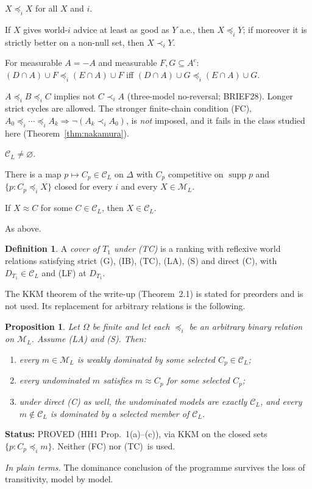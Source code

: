 \documentclass[11pt]{article}
\newtheorem{proposition}[theorem]{Proposition}
\theoremstyle{definition}
\newtheorem{definition}[theorem]{Definition}
\theoremstyle{remark}
\newcommand{\M}{\mathcal M}
\newcommand{\C}{\mathcal C}
\newcommand{\supp}{\operatorname{supp}}
\newcommand{\src}[1]{\textsf{#1}}
\newcommand{\status}[1]{\par\smallskip\noindent\textbf{Status:} #1\par}
\newcommand{\inwords}[1]{\noindent\textit{In plain terms.} #1\par\smallskip}
\newcommand{\TC}{\textup{(TC)}}
\begin{document}
\begin{description}[leftmargin=1.5em,style=unboxed,font=\normalfont\bfseries]
\item[Reflexivity.] $X\preceq_iX$ for all $X$ and $i$.
\item[Strict (G).] If $X$ gives world-$i$ advice at least as good as $Y$ a.e., then $X\preceq_iY$; if moreover it is strictly better on a non-null set, then $X\prec_iY$.
\item[(IB).] For measurable $A=-A$ and measurable $F,G\subseteq A^c$: $(D\cap A)\cup F\preceq_i(E\cap A)\cup F$ iff $(D\cap A)\cup G\preceq_i(E\cap A)\cup G$.
\item[(TC).] $A\preceq_iB\preceq_iC$ implies not $C\prec_iA$ (three-model no-reversal; \src{BRIEF28}). Longer strict cycles are allowed. The stronger finite-chain condition (FC), $A_0\preceq_i\cdots\preceq_iA_k\Rightarrow\neg(A_k\prec_iA_0)$, is \emph{not} imposed, and it fails in the class studied here (Theorem~\ref{thm:nakamura}).
\item[(LA).] $\C_L\ne\varnothing$.
\item[(S).] There is a map $p\mapsto C_p\in\C_L$ on $\Delta$ with $C_p$ competitive on $\supp p$ and $\{p:C_p\preceq_iX\}$ closed for every $i$ and every $X\in\M_L$.
\item[Direct (C).] If $X\approx C$ for some $C\in\C_L$, then $X\in\C_L$.
\item[(LF) at the target.] As above.
\end{description}

\begin{definition}\label{def:cover}
A \emph{cover of $T_1$ under \TC} is a ranking with reflexive world relations satisfying strict (G), (IB), \TC, (LA), (S) and direct (C), with $D_{T_1}\in\C_L$ and (LF) at $D_{T_1}$.
\end{definition}

The KKM theorem of the write-up (Theorem~2.1) is stated for preorders and is not used. Its replacement for arbitrary relations is the following.

\begin{proposition}\label{prop:hh1}
Let $\Omega$ be finite and let each $\preceq_i$ be an arbitrary binary relation on $\M_L$. Assume (LA) and (S). Then:
\begin{enumerate}[label=(\alph*)]
\item every $m\in\M_L$ is weakly dominated by some selected $C_p\in\C_L$;
\item every undominated $m$ satisfies $m\approx C_p$ for some selected $C_p$;
\item under direct (C) as well, the undominated models are exactly $\C_L$, and every $m\notin\C_L$ is dominated by a selected member of $\C_L$.
\end{enumerate}
\end{proposition}
\status{PROVED (\src{HH1} Prop.~1(a)--(c)), via KKM on the closed sets $\{p:C_p\preceq_im\}$. Neither (FC) nor \TC\ is used.}
\inwords{The dominance conclusion of the programme survives the loss of transitivity, model by model.}
\end{document}
